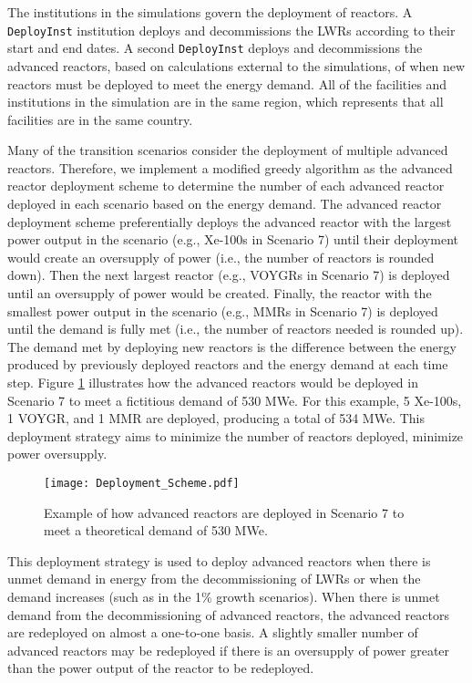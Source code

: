 The institutions in the simulations 
govern the deployment of reactors. A \Cycamore \texttt{DeployInst} 
institution \cite{huff_fundamental_2016} deploys and decommissions the 
\glspl{LWR} according to their start and end dates. A second \Cycamore 
\texttt{DeployInst} deploys and decommissions the advanced reactors, 
based on calculations external to the \Cyclus simulations, of when 
new reactors must be deployed to meet the energy 
demand. All of the facilities and institutions in the simulation are in 
the same region, which represents that all facilities are in the same 
country. 

Many of the transition scenarios consider the deployment of 
multiple advanced reactors. Therefore, we implement a modified greedy 
algorithm as the advanced reactor deployment scheme
to determine the number of each advanced reactor deployed in each 
scenario based on the energy demand. 
The advanced reactor deployment scheme preferentially deploys the advanced 
reactor with the largest power output in the scenario (e.g., Xe-100s in 
Scenario 7) until their deployment would create an oversupply of power
(i.e., the number of reactors is rounded down). 
Then the next largest reactor (e.g., VOYGRs in Scenario 7) is deployed 
until an oversupply of power would be 
created. Finally, the reactor 
with the smallest power output in the scenario (e.g., \glspl{MMR} in 
Scenario 7) is deployed until the demand is fully met (i.e., the number of 
reactors needed is rounded up). The demand 
met by deploying new reactors is the difference between the energy 
produced by previously deployed reactors and the energy demand at each 
time step. 
Figure \ref{fig:AR_deployment} illustrates how the advanced reactors 
would be deployed in Scenario 7 to meet a fictitious demand of 530 MWe. For this 
example, 5 Xe-100s, 1 VOYGR, and 1 \gls{MMR} are deployed, producing a 
total of 534 MWe. This deployment 
strategy aims to minimize the number of reactors deployed,  
minimize power oversupply.

\begin{figure}[ht]
    \centering
    \texttt{[image: Deployment\_Scheme.pdf]}
    \caption{Example of how advanced reactors are deployed in Scenario 7 
    to meet a theoretical demand of 530 MWe.}
    \label{fig:AR_deployment}
\end{figure}

This deployment strategy is used to deploy advanced reactors when there is
unmet demand in energy from the decommissioning of \glspl{LWR} or 
when the demand increases (such as in the 1\% growth scenarios). When 
there is unmet demand from the decommissioning of advanced reactors, the 
advanced reactors are redeployed on almost a one-to-one basis. A slightly
smaller number of advanced reactors may be redeployed if there is an 
oversupply of power greater than the power output of the reactor to be 
redeployed. 

